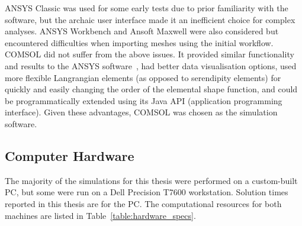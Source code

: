 ANSYS Classic was used for some early tests due to prior familiarity with the
software, but the archaic user interface made it an inefficient choice for
complex analyses. ANSYS Workbench and Ansoft Maxwell were also considered but
encountered difficulties when importing meshes using the initial workflow.
COMSOL did not suffer from the above issues. It provided similar functionality
and results to the ANSYS software~\cite{tran2015}, had better data visualisation
options, used more flexible Langrangian elements (as opposed to serendipity
elements) for quickly and easily changing the order of the elemental shape
function, and could be programmatically extended using its Java API (application
programming interface). Given these advantages, COMSOL was chosen as the
simulation software.

\subsection{Computer Hardware}

The majority of the simulations for this thesis were performed on a custom-built
PC, but some were run on a Dell Precision T7600 workstation. Solution times
reported in this thesis are for the PC. The computational resources for both
machines are listed in Table~\ref{table:hardware_specs}.

